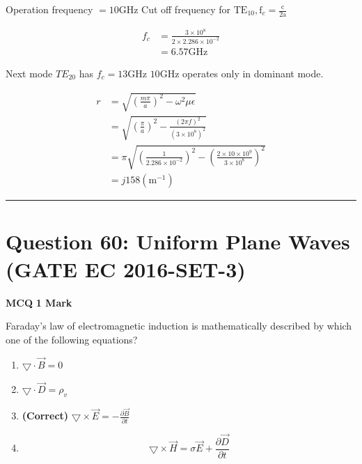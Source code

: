 \documentclass[11pt,a4paper]{article}
\begin{document}
\begin{tcolorbox}[solbox, title=Detailed Solution -- Question 59]
Operation frequency $=10 \mathrm{GHz}$
 Cut off frequency for $\mathrm{TE}_{10}, \mathrm{f}_{c}=\frac{\mathrm{c}}{2 \mathrm{a}}$

\[
\begin{aligned} f_{c} &=\frac{3 \times 10^{8}}{2 \times 2.286 \times 10^{-2}} \\ &=6.57 \mathrm{GHz} \end{aligned}
\]

 Next mode $T E_{20}$ has $f_{c}=13 \mathrm{GHz}$
$10 \mathrm{GHz}$ operates only in dominant mode.

\[
\begin{aligned} r &=\sqrt{\left(\frac{m \pi}{a}\right)^{2}-\omega^{2} \mu \epsilon} \\ &=\sqrt{\left(\frac{\pi}{a}\right)^{2}-\frac{(2 \pi f)^{2}}{\left(3 \times 10^{8}\right)^{2}}} \\ &=\pi \sqrt{\left(\frac{1}{2.286 \times 10^{-2}}\right)^{2}-\left(\frac{2 \times 10 \times 10^{9}}{3 \times 10^{8}}\right)^{2}} \\ &=j 158\left(\mathrm{m}^{-1}\right) \end{aligned}
\]
\end{tcolorbox}

\vspace{1.5em}
\hrule
\vspace{1.5em}

\section*{Question 60: Uniform Plane Waves (GATE EC 2016-SET-3)}
\noindent \textbf{\color{primary}MCQ} \hfill \textbf{\color{secondary}1 Mark}


\noindent Faraday's law of electromagnetic induction is mathematically described by which one of the following equations?


\begin{enumerate}[label=(\Alph*)]
    \item $\bigtriangledown \cdot \vec{B}=0$
    \item $\bigtriangledown \cdot \vec{D}=\rho _{v}$
    \item \textbf{(Correct)} $\bigtriangledown  \times \vec{E}=-\frac{\partial \vec{B}}{\partial t}$
    \item \[
\bigtriangledown  \times \vec{H}=\sigma \vec{E}+\frac{\partial \vec{D}}{\partial t}
\]
\end{enumerate}
\end{document}
